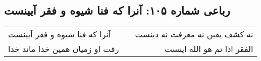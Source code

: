 \begin{center}
\section*{رباعی شماره ۱۰۵: آنرا که فنا شیوه و فقر آیینست}
\label{sec:sh105}
\begin{longtable}{l p{0.5cm} r}
آنرا که فنا شیوه و فقر آیینست
&&
نه کشف یقین نه معرفت نه دینست
\\
رفت او زمیان همین خدا ماند خدا
&&
الفقر اذا تم هو الله اینست
\\
\end{longtable}
\end{center}
